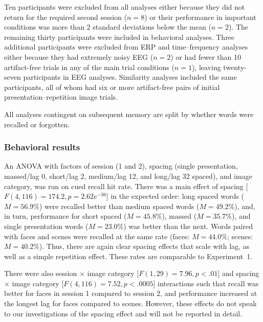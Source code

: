 

Ten participants were excluded from all analyses either because they did not return for the required second session ($n=8$) or their performance in important conditions was more than 2 standard deviations below the mean ($n=2$).  The remaining thirty participants were included in behavioral analyses.
Three additional participants were excluded from ERP and time--frequency analyses either because they had extremely noisy EEG ($n=2$) or had fewer than 10 artifact-free trials in any of the main trial conditions ($n=1$), leaving twenty-seven participants in EEG analyses.  Similarity analyses included the same participants, all of whom had six or more artifact-free pairs of initial presentation--repetition image trials.

All analyses contingent on subsequent memory are split by whether words were recalled or forgotten.

\subsubsection{Behavioral results}

An ANOVA with factors of session (1 and 2), spacing (single presentation, massed/lag 0, short/lag 2, medium/lag 12, and long/lag 32 spaced), and image category, was run on cued recall hit rate.  There was a main effect of spacing [$F(4,116)=174.2, p=2.62e^{-36}$] in the expected order: long spaced words ($M=56.9\%$) were recalled better than medium spaced words ($M=49.2\%$), and, in turn, performance for short spaced ($M=45.8\%$), massed ($M=35.7\%$), and single presentation words ($M=23.0\%$) was better than the next.  Words paired with faces and scenes were recalled at the same rate (faces: $M=44.0\%$; scenes: $M=40.2\%$).  Thus, there are again clear spacing effects that scale with lag, as well as a simple repetition effect. These rates are comparable to Experiment~1.

There were also session $\times$ image category [$F(1,29)=7.96, p<.01$] and spacing $\times$ image category [$F(4,116)=7.52, p<.0005$] interactions such that recall was better for faces in session 1 compared to session 2, and performance increased at the longest lag for faces compared to scenes.  However, these effects do not speak to our investigations of the spacing effect and will not be reported in detail.

